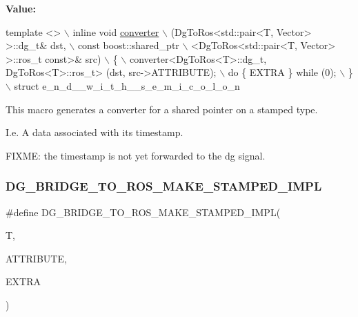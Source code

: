 {\bfseries Value\+:}
\begin{DoxyCode}
\textcolor{keyword}{template} <>                             \(\backslash\)
  inline \textcolor{keywordtype}{void} \hyperlink{namespacedynamic__graph_a38ff488b8b21c0b4f4d7f44572fa4ee5}{converter}                            \(\backslash\)
  (DgToRos<std::pair<T, Vector> >::dg\_t& dst,           \(\backslash\)
   const boost::shared\_ptr                      \(\backslash\)
   <DgToRos<std::pair<T, Vector> >::ros\_t \textcolor{keyword}{const}>& src)      \(\backslash\)
  \{                                 \(\backslash\)
    converter<DgToRos<T>::dg\_t, DgToRos<T>::ros\_t> (dst, src->ATTRIBUTE); \(\backslash\)
    do \{ EXTRA \} \textcolor{keywordflow}{while} (0);                     \(\backslash\)
  \}                                 \(\backslash\)
  struct e\_n\_d\_\_w\_i\_t\_h\_\_s\_e\_m\_i\_c\_o\_l\_o\_n
\end{DoxyCode}


This macro generates a converter for a shared pointer on a stamped type. 

I.\+e. A data associated with its timestamp.

F\+I\+X\+ME\+: the timestamp is not yet forwarded to the dg signal. \mbox{\label{converter_8hh_ae02c25236f7cecbfbdbf9cc9239cb785}} 
\subsubsection{\texorpdfstring{D\+G\+\_\+\+B\+R\+I\+D\+G\+E\+\_\+\+T\+O\+\_\+\+R\+O\+S\+\_\+\+M\+A\+K\+E\+\_\+\+S\+T\+A\+M\+P\+E\+D\+\_\+\+I\+M\+PL}{DG\_BRIDGE\_TO\_ROS\_MAKE\_STAMPED\_IMPL}}
{\footnotesize\ttfamily \#define D\+G\+\_\+\+B\+R\+I\+D\+G\+E\+\_\+\+T\+O\+\_\+\+R\+O\+S\+\_\+\+M\+A\+K\+E\+\_\+\+S\+T\+A\+M\+P\+E\+D\+\_\+\+I\+M\+PL(\begin{DoxyParamCaption}\item[{}]{T,  }\item[{}]{A\+T\+T\+R\+I\+B\+U\+TE,  }\item[{}]{E\+X\+T\+RA }\end{DoxyParamCaption})}

